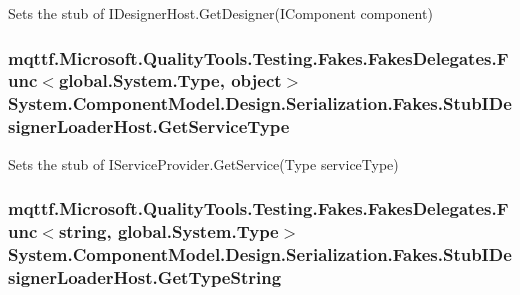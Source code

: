 Sets the stub of I\-Designer\-Host.\-Get\-Designer(\-I\-Component component)

\hypertarget{class_system_1_1_component_model_1_1_design_1_1_serialization_1_1_fakes_1_1_stub_i_designer_loader_host_aa8f3dc4d95c63367722b01ccbbbcff1d}{
\subsubsection[{Get\-Service\-Type}]{\setlength{\rightskip}{0pt plus 5cm}mqttf.\-Microsoft.\-Quality\-Tools.\-Testing.\-Fakes.\-Fakes\-Delegates.\-Func$<$global.\-System.\-Type, object$>$ System.\-Component\-Model.\-Design.\-Serialization.\-Fakes.\-Stub\-I\-Designer\-Loader\-Host.\-Get\-Service\-Type}}\label{class_system_1_1_component_model_1_1_design_1_1_serialization_1_1_fakes_1_1_stub_i_designer_loader_host_aa8f3dc4d95c63367722b01ccbbbcff1d}


Sets the stub of I\-Service\-Provider.\-Get\-Service(\-Type service\-Type)

\hypertarget{class_system_1_1_component_model_1_1_design_1_1_serialization_1_1_fakes_1_1_stub_i_designer_loader_host_a514b4e20e7dae33db6db3bbefb9cd55a}{
\subsubsection[{Get\-Type\-String}]{\setlength{\rightskip}{0pt plus 5cm}mqttf.\-Microsoft.\-Quality\-Tools.\-Testing.\-Fakes.\-Fakes\-Delegates.\-Func$<$string, global.\-System.\-Type$>$ System.\-Component\-Model.\-Design.\-Serialization.\-Fakes.\-Stub\-I\-Designer\-Loader\-Host.\-Get\-Type\-String}}\label{class_system_1_1_component_model_1_1_design_1_1_serialization_1_1_fakes_1_1_stub_i_designer_loader_host_a514b4e20e7dae33db6db3bbefb9cd55a}


